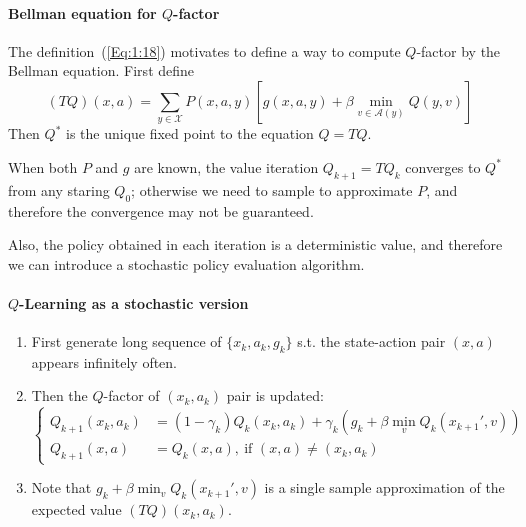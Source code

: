 \paragraph{Bellman equation for $Q$-factor}
The definition~(\ref{Eq:1:18}) motivates to define a way to compute $Q$-factor by the Bellman equation. First define
\begin{equation}
(TQ)(x,a)=\sum_{y\in\mathcal{X}}P(x,a,y)\left[g(x,a,y)+\beta\min_{v\in\mathcal{A}(y)}Q(y,v)\right]
\end{equation}
Then $Q^*$ is the unique fixed point to the equation $Q=TQ$.
\begin{remark}
When both $P$ and $g$ are known, the value iteration $Q_{k+1}=TQ_k$ converges to $Q^*$ from any staring $Q_0$; otherwise we need to sample to approximate $P$, and therefore the convergence may not be guaranteed.

Also, the policy obtained in each iteration is a deterministic value, and therefore we can introduce a stochastic policy evaluation algorithm.
\end{remark}

\paragraph{$Q$-Learning as a stochastic version}
\begin{enumerate}
\item
First generate long sequence of $\{x_k,a_k,g_k\}$ s.t. the state-action pair $(x,a)$ appears infinitely often.
\item
Then the $Q$-factor of $(x_k,a_k)$ pair is updated:
\begin{equation}
\left\{
\begin{aligned}
Q_{k+1}(x_k,a_k)&=(1-\gamma_k)Q_k(x_k,a_k)+\gamma_k\left(g_k+\beta\min_vQ_k(x_{k+1}',v)\right)\\
Q_{k+1}(x,a)&=Q_k(x,a),\ \text{if }(x,a)\ne(x_k,a_k)
\end{aligned}
\right.
\end{equation}
\item
Note that $g_k+\beta\min_vQ_k(x_{k+1}',v)$ is a single sample approximation of the expected value $(TQ)(x_k,a_k)$.
\end{enumerate}


